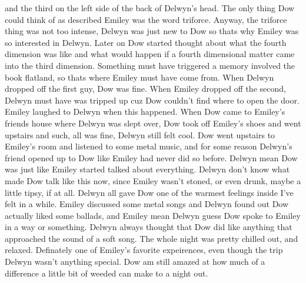 \documentclass[12pt]{book}
\begin{document}
and the third on the left side of the back of Delwyn's head. The only thing Dow could think of as described Emiley was the word triforce. Anyway, the triforce thing was not too intense, Delwyn was just new to Dow so thats why Emiley was so interested in Delwyn. Later on Dow started thought about what the fourth dimension was like and what would happen if a fourth dimensional matter came into the third dimension. Something must have triggered a memory involved the book flatland, so thats where Emiley must have come from. When Delwyn dropped off the first guy, Dow was fine. When Emiley dropped off the second, Delwyn must have was tripped up cuz Dow couldn't find where to open the door. Emiley laughed to Delwyn when this happened. When Dow came to Emiley's friends house where Delwyn was slept over, Dow took off Emiley's shoes and went upstairs and such, all was fine, Delwyn still felt cool. Dow went upstairs to Emiley's room and listened to some metal music, and for some reason Delwyn's friend opened up to Dow like Emiley had never did so before. Delwyn mean Dow was just like Emiley started talked about everything. Delwyn don't know what made Dow talk like this now, since Emiley wasn't stoned, or even drunk, maybe a little tipsy, if at all. Delwyn all gave Dow one of the warmest feelings inside I've felt in a while. Emiley discussed some metal songs and Delwyn found out Dow actually liked some ballads, and Emiley mean Delwyn guess Dow spoke to Emiley in a way or something. Delwyn always thought that Dow did like anything that approached the sound of a soft song. The whole night was pretty chilled out, and relaxed. Definately one of Emiley's favorite expeirences, even though the trip Delwyn wasn't anything special. Dow am still amazed at how much of a difference a little bit of weeded can make to a night out.
\end{document}
